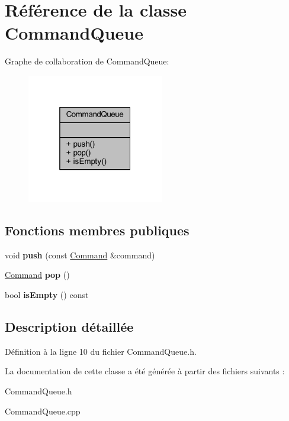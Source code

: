 \hypertarget{class_command_queue}{}\section{Référence de la classe Command\+Queue}
\label{class_command_queue}


Graphe de collaboration de Command\+Queue\+:\nopagebreak
\begin{figure}[H]
\begin{center}
\leavevmode
\includegraphics[width=169pt]{class_command_queue__coll__graph}
\end{center}
\end{figure}
\subsection*{Fonctions membres publiques}
\begin{DoxyCompactItemize}
\item 
\hypertarget{class_command_queue_ad444e0d7af45d9e09b834f0cec1e1f43}{}\label{class_command_queue_ad444e0d7af45d9e09b834f0cec1e1f43} 
void {\bfseries push} (const \hyperlink{struct_command}{Command} \&command)
\item 
\hypertarget{class_command_queue_ac2dde510222b8df393b55978f4594194}{}\label{class_command_queue_ac2dde510222b8df393b55978f4594194} 
\hyperlink{struct_command}{Command} {\bfseries pop} ()
\item 
\hypertarget{class_command_queue_a3a6eb6a7c83d9b20ad7a6cac63795ec1}{}\label{class_command_queue_a3a6eb6a7c83d9b20ad7a6cac63795ec1} 
bool {\bfseries is\+Empty} () const
\end{DoxyCompactItemize}


\subsection{Description détaillée}


Définition à la ligne 10 du fichier Command\+Queue.\+h.



La documentation de cette classe a été générée à partir des fichiers suivants \+:\begin{DoxyCompactItemize}
\item 
Command\+Queue.\+h\item 
Command\+Queue.\+cpp\end{DoxyCompactItemize}
